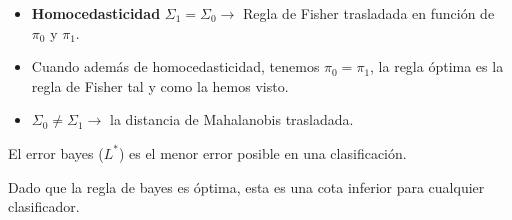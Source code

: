 \begin{itemize}
  \item \textbf{Homocedasticidad} $Σ_1 = Σ_0 \to$ Regla de Fisher trasladada en función de $π_0$ y $π_1$.
  \item Cuando además de homocedasticidad, tenemos $π_0 = π_1$, la regla óptima es la regla de Fisher tal y como la hemos visto.
  \item $Σ_0 ≠ Σ_1 \to $ la distancia de Mahalanobis trasladada.
\end{itemize}


\begin{defn}
El error bayes ($L^{*}$) es el menor error posible en una clasificación.
\end{defn}

\obs Dado que la regla de bayes es óptima, esta es una cota inferior para cualquier clasificador.